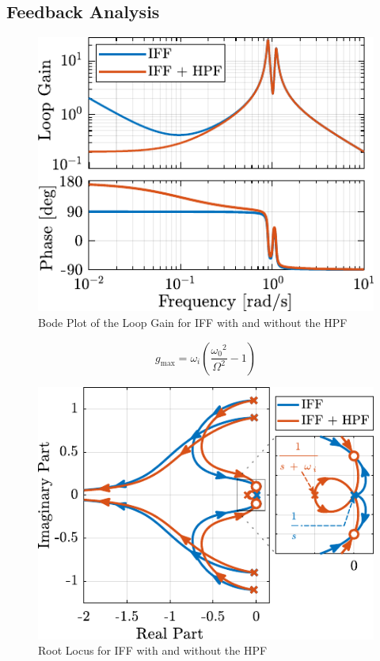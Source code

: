 \documentclass{ISMA_USD2020}
\begin{document}
\subsection{Feedback Analysis}
\label{sec:org2673698}
\begin{figure}[htbp]
\centering
\includegraphics[scale=1]{figs/loop_gain_modified_iff.pdf}
\caption{\label{fig:loop_gain_modified_iff}Bode Plot of the Loop Gain for IFF with and without the HPF}
\end{figure}

\begin{equation}
  g_\text{max} = \omega_i \left( \frac{{\omega_0}^2}{\Omega^2} - 1 \right) \label{eq:iff_gmax}
\end{equation}

\begin{figure}[htbp]
\centering
\includegraphics[scale=1]{figs/root_locus_modified_iff.pdf}
\caption{\label{fig:root_locus_modified_iff}Root Locus for IFF with and without the HPF}
\end{figure}
\end{document}
